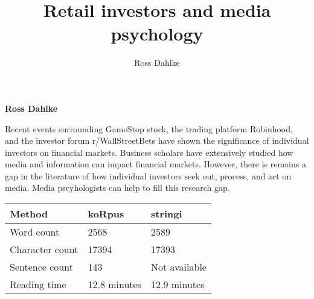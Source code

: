 \documentclass[12pt,]{article}
\title{Retail investors and media psychology  }
\author{\Large Ross Dahlke\vspace{0.05in} \newline\normalsize\emph{}  }
\date{}
\newcommand*{\authorfont}{\fontfamily{phv}\selectfont}
\renewenvironment{abstract}
 {{%
    \setlength{\leftmargin}{0mm}
    \setlength{\rightmargin}{\leftmargin}%
  }%
  \relax}
 {\endlist}
\begin{document}
	
%

{%
\setlength{\parindent}{0pt}
\thispagestyle{plain}
{\fontsize{18}{20}\selectfont\raggedright 
\maketitle  %

}

{
   \vskip 13.5pt\relax \normalsize\fontsize{11}{12} 
\textbf{\authorfont Ross Dahlke} \hskip 15pt \emph{\small }   

}

}








\begin{abstract}

    \hbox{\vrule height .2pt width 39.14pc}

    \vskip 8.5pt %

\noindent Recent events surrounding GameStop stock, the trading platform
Robinhood, and the investor forum r/WallStreetBets have shown the
significance of individual investors on financial markets. Business
scholars have extensively studied how media and information can impact
financial markets. However, there is remains a gap in the literature of
how individual investors seek out, process, and act on media. Media
pscyhologists can help to fill this research gap.


    \hbox{\vrule height .2pt width 39.14pc}


\end{abstract}


\vskip -8.5pt



\noindent \doublespacing 

\begin{longtable}[]{@{}lll@{}}
\toprule
Method & koRpus & stringi\tabularnewline
\midrule
\endhead
Word count & 2568 & 2589\tabularnewline
Character count & 17394 & 17393\tabularnewline
Sentence count & 143 & Not available\tabularnewline
Reading time & 12.8 minutes & 12.9 minutes\tabularnewline
\bottomrule
\end{longtable}
\end{document}
